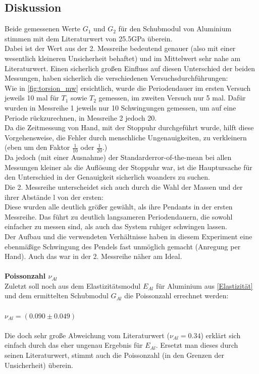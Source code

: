 \documentclass[12pt,a4paper]{article}
\begin{document}
\begin{multicols}{2}
\subsection{Diskussion}
Beide gemessenen Werte $G_1$ und $G_2$ für den Schubmodul von Aluminium stimmen mit dem Literaturwert von 25.5GPa überein.\\
Dabei ist der Wert aus der 2. Messreihe bedeutend genauer (also mit einer wesentlich kleineren Unsicherheit behaftet) und im Mittelwert sehr nahe am Literaturwert.
Einen sicherlich großen Einfluss auf diesen Unterschied der beiden Messungen, haben sicherlich die verschiedenen Versuchsdurchführungen:\\
Wie in \ref{fig:torsion_mw} ersichtlich, wurde die Periodendauer im ersten Versuch jeweils 10 mal für $T_1$ sowie $T_2$ gemessen, im zweiten Versuch nur 5 mal. Dafür wurden in Messreihe 1 jeweils nur 10 Schwingungen gemessen, um auf eine Periode rückzurechnen, in Messreihe 2 jedoch 20.\\
Da die Zeitmessung von Hand, mit der Stoppuhr durchgeführt wurde, hilft diese Vorgehensweise, die Fehler durch menschliche Ungenauigkeiten, zu verkleinern (eben um den Faktor $\frac{1}{10}$ oder $\frac{1}{20}$.)\\
Da jedoch (mit einer Ausnahme) der Standarderror-of-the-mean bei allen Messungen kleiner als die Auflösung der Stoppuhr war, ist die Hauptursache für den Unterschied in der Genauigkeit sicherlich woanders zu suchen.\\
Die 2. Messreihe unterscheidet sich auch durch die Wahl der Massen und der ihrer Abstände l von der ersten:\\
Diese wurden alle deutlich größer gewählt, als ihre Pendants in der ersten Messreihe. Das führt zu deutlich langsameren Periodendauern, die sowohl einfacher zu messen sind, als auch das System ruhiger schwingen lassen.\\
Der Aufbau und die verwendeten Verhältnisse haben in diesem Experiment eine ebenmäßige Schwingung des Pendels fast unmöglich gemacht (Anregung per Hand). Auch das war in der 2. Messreihe näher am Ideal.\\
\\
\textbf{Poissonzahl $\nu_{Al}$}\\
Zuletzt soll noch aus dem Elastizitätsmodul $E_{Al}$ für Aluminium aus \ref{Elastizität} und dem ermittelten Schubmodul $G_{Al}$ die Poissonzahl errechnet werden:\\
\\
$\nu_{Al} = (0.090 \pm 0.049)$\\
\\
Die doch sehr große Abweichung vom Literaturwert ($\nu_{Al}=0.34$) erklärt sich einfach durch das eher ungenau Ergebnis für $E_{Al}$. Ersetzt man dieses durch seinen Literaturwert, stimmt auch die Poissonzahl (in den Grenzen der Unsicherheit) überein.



\end{multicols}
\end{document}
